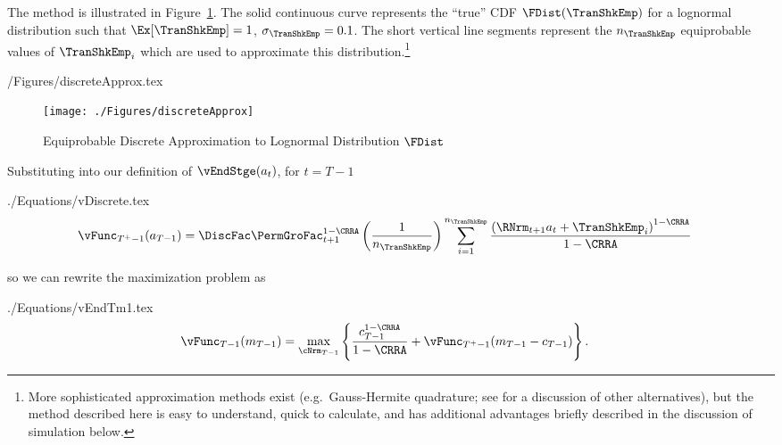 \documentclass[titlepage, headings=optiontotocandhead]{\econtex}
\begin{document}
The method is illustrated in Figure~\ref{fig:discreteapprox}.  The solid continuous curve represents
the ``true'' CDF $\FDist(\TranShkEmp)$ for a lognormal distribution such that $\Ex[\TranShkEmp] = 1$, $\sigma_{\TranShkEmp} = 0.1$.  The short vertical line segments represent the $n_{\TranShkEmp}$
equiprobable values of $\TranShkEmp_{i}$ which are used to approximate this
distribution.\footnote{More sophisticated approximation methods exist
  (e.g.\ Gauss-Hermite quadrature; see \cite{kopecky2010finite} for a discussion of other alternatives), but the method described here is easy to understand, quick to calculate, and has additional advantages briefly described in the
  discussion of simulation below.}
\begin{verbatimwrite}{\econtexRoot/Figures/discreteApprox.tex}
  \hypertarget{discreteApprox}{}
  \begin{figure}
    \texttt{[image: ./Figures/discreteApprox]}
    \caption{Equiprobable Discrete Approximation to Lognormal Distribution $\FDist$}
    \label{fig:discreteapprox}
  \end{figure}
\end{verbatimwrite}
\unskip

Substituting into our definition of $\vEndStge({a}_{t})$, for $t=T-1$
\begin{verbatimwrite}{./Equations/vDiscrete.tex}
  \begin{equation}\begin{gathered}\begin{aligned}
        \vFunc_{T^{+}-1}({a}_{T-1})  & =   \DiscFac \PermGroFac_{t+1}^{1-\CRRA}\left(\frac{1}{n_{\TranShkEmp}}\right)\sum_{i=1}^{n_{\TranShkEmp}}   \frac{\left(\RNrm_{t+1} {a}_{t} + \TranShkEmp_{i}\right)^{1-\CRRA}}{1-\CRRA} \label{eq:vDiscrete}
      \end{aligned}\end{gathered}\end{equation}
\end{verbatimwrite}
\unskip
so we can rewrite the maximization problem as 
\begin{verbatimwrite}{./Equations/vEndTm1.tex}
  \begin{equation}\begin{gathered}\begin{aligned}
        {\vFunc}_{T-1}({m}_{T-1})   & = \max_{\cNrm_{T-1}}
        \left\{
          \frac{{c}_{T-1}^{1-\CRRA}}{1-\CRRA} +
          \vFunc_{T^{+}-1}({m}_{T-1}-{c}_{T-1})
        \right\}.
        \label{eq:vEndTm1}
      \end{aligned}\end{gathered}\end{equation}
\end{verbatimwrite}
\unskip
\end{document}
